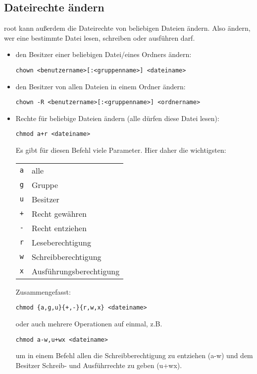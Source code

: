 \documentclass[a4paper,12pt]{article}
\begin{document}
\subsection{Dateirechte ändern}
root kann außerdem die Dateirechte von beliebigen Dateien ändern. Also ändern, 
wer eine bestimmte Datei lesen, schreiben oder ausführen darf.  
\begin{itemize}
\item den Besitzer einer beliebigen Datei/eines Ordners ändern:
\begin{lstlisting}
chown <benutzername>[:<gruppenname>] <dateiname>
\end{lstlisting} 
\item den Besitzer von allen Dateien in einem Ordner ändern:
\begin{lstlisting}
chown -R <benutzername>[:<gruppenname>] <ordnername>
\end{lstlisting} 
\item Rechte für beliebige Dateien ändern (alle dürfen diese Datei lesen):
\begin{lstlisting}
chmod a+r <dateiname>
\end{lstlisting} 
Es gibt für diesen Befehl viele Parameter. Hier daher die wichtigsten:
\begin{center}
\begin{tabular}{ll}
\texttt{a} & alle \\
\texttt{g} & Gruppe \\
\texttt{u} & Besitzer \\
\texttt{+} & Recht gewähren \\
\texttt{-} & Recht entziehen \\
\texttt{r} & Leseberechtigung \\
\texttt{w} & Schreibberechtigung \\
\texttt{x} & Ausführungsberechtigung \\
\end{tabular}
\end{center} 
Zusammengefasst:
\begin{lstlisting}
chmod {a,g,u}{+,-}{r,w,x} <dateiname>
\end{lstlisting}
oder auch mehrere Operationen auf einmal, z.B.
\begin{lstlisting}
chmod a-w,u+wx <dateiname>
\end{lstlisting}
um in einem Befehl allen die Schreibberechtigung zu entziehen (a-w) und dem
Besitzer Schreib- und Ausführrechte zu geben (u+wx).

\end{itemize}   
\end{document}
